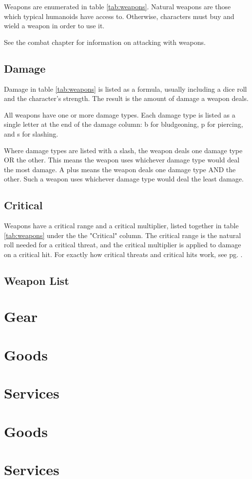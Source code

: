 \begin{multicols}{2}
    Weapons are enumerated in table \ref{tab:weapons}. Natural weapons are
    those which typical humanoids have access to. Otherwise, characters must
    buy and wield a weapon in order to use it.

    See the combat chapter for information on attacking with weapons.

    \subsection{Damage}
    Damage in table \ref{tab:weapons} is listed as a formula, usually
    including a dice roll and the character's strength. The result is the
    amount of damage a weapon deals.

    All weapons have one or more damage types. Each damage type is listed as
    a single letter at the end of the damage column: b for bludgeoning, p for
    piercing, and s for slashing.

    Where damage types are listed with a slash, the weapon deals one damage
    type OR the other. This means the weapon uses whichever damage type
    would deal the most damage. A plus means the weapon deals one damage
    type AND the other. Such a weapon uses whichever damage type would deal
    the least damage.

    \subsection{Critical}
    Weapons have a critical range and a critical multiplier, listed together
    in table \ref{tab:weapons} under the the "Critical" column. The critical
    range is the natural roll needed for a critical threat, and the critical
    multiplier is applied to damage on a critical hit. For exactly how critical
    threats and critical hits work, see pg. \pageref{combat:critical-hits}.

    \subsection{Weapon List}

    \section{Gear}

    \section{Goods}

    \section{Services}
\end{multicols}



\section{Goods}

\section{Services}
